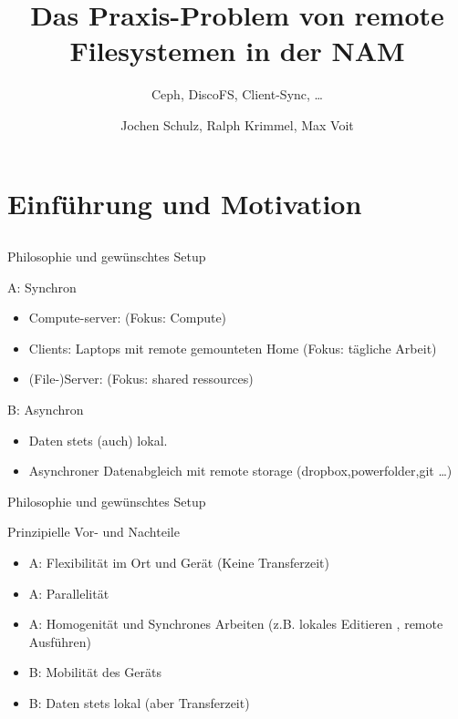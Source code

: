 \documentclass[hyperref={xetex}]{beamer}
\title{Das Praxis-Problem von remote Filesystemen in der NAM}
\subtitle{ Ceph, DiscoFS, Client-Sync, \ldots}
\author{Jochen Schulz, Ralph Krimmel, Max Voit}
\begin{document}
	\nocite{*} 
	\begin{frame}
		\titlepage
	\end{frame}

	\begin{frame}
		\tableofcontents
	\end{frame}


\section{Einf\"uhrung und Motivation}
\subsection*{}

\begin{frame}{Philosophie und gewünschtes Setup}
    \begin{block}{A: Synchron}
    \begin{itemize}    
        \item Compute-server: (Fokus: Compute)
        \item Clients: Laptops mit remote gemounteten Home (Fokus: tägliche Arbeit)
        \item (File-)Server: (Fokus: shared ressources)
    \end{itemize}
\end{block}

\begin{block}{B: Asynchron}
    \begin{itemize}
                    \item  Daten stets (auch) lokal. 
                    \item Asynchroner Datenabgleich mit remote storage (dropbox,powerfolder,git \ldots )
                \end{itemize}

\end{block}
\end{frame}

\begin{frame}{Philosophie und gewünschtes Setup}

\begin{block}{Prinzipielle Vor- und Nachteile}
    \begin{itemize}
        \item A: Flexibilität im Ort und Gerät (Keine Transferzeit)
        \item A: Parallelität
        \item A: Homogenität und Synchrones Arbeiten (z.B. lokales Editieren , remote Ausführen)
        \item B: Mobilität des Geräts
        \item B: Daten stets lokal (aber Transferzeit)
    \end{itemize}
    
\end{block}
    

\end{frame}
\end{document}
